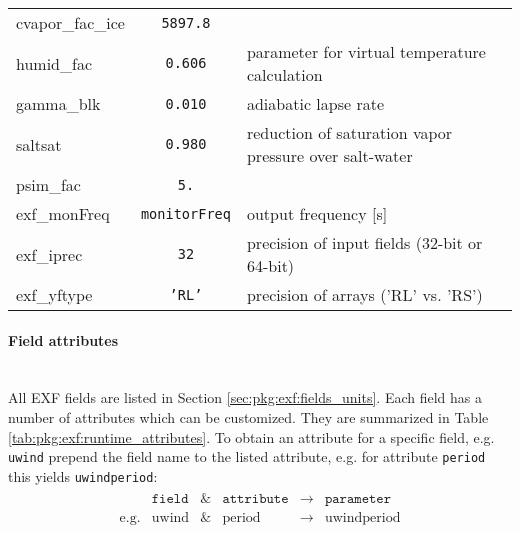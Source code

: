 \begin{table}[h!]
{\begin{tabular}{|l|c|l|}
        cvapor\_fac\_ice & \texttt{5897.8} & 
          ~ \\
        humid\_fac & \texttt{0.606} & 
          parameter for virtual temperature calculation \\
        gamma\_blk & \texttt{0.010} & 
          adiabatic lapse rate \\
        saltsat & \texttt{0.980} & 
          reduction of saturation vapor pressure over salt-water \\          
        psim\_fac & \texttt{5.} & 
          ~ \\          
        exf\_monFreq & \texttt{monitorFreq} & 
          output frequency [s] \\
        exf\_iprec  & \texttt{32} & 
          precision of input fields (32-bit or 64-bit) \\
        exf\_yftype & \texttt{'RL'} & 
          precision of arrays ('RL' vs. 'RS') \\
      \hline
    \end{tabular}
  }
  \caption{~}
\end{table}


\paragraph{Field attributes} 
~ \\
%
All EXF fields are listed in Section \ref{sec:pkg:exf:fields_units}.
Each field has a number of attributes which can be customized.
They are summarized in
Table \ref{tab:pkg:exf:runtime_attributes}.
To obtain an attribute for a specific field, e.g. \texttt{uwind}
prepend the field name to the listed attribute, e.g. for attribute
\texttt{period} this yields \texttt{uwindperiod}:
%
\begin{eqnarray*}
  \begin{array}{cccccc}
    ~ & \texttt{field} & \& & \texttt{attribute} & \longrightarrow & \texttt{parameter} \\
    \text{e.g.} & \text{uwind} & \& & \text{period} & \longrightarrow & \text{uwindperiod} \\
  \end{array}
\end{eqnarray*}
%

